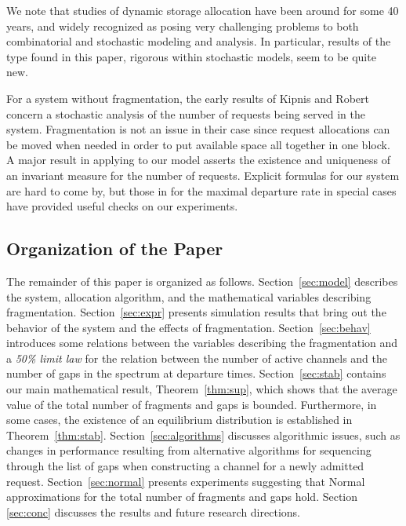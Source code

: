 \documentclass{amsart}
\begin{document}
We note that studies of dynamic storage allocation have been around for some
40 years, and widely recognized as posing very challenging problems
to both combinatorial and stochastic modeling and analysis. In particular, results of  the type
found in this paper, rigorous within stochastic models, seem to be quite new.

For a system without fragmentation, the early results of Kipnis and Robert \cite{KipnisR1990}
concern a stochastic analysis of the number of requests being served in the system.  Fragmentation is not an
issue in their case since request  allocations can  be moved  when  needed in  order to  put
available space all together in one  block.   A major result in  \cite{KipnisR1990} applying to our
model  asserts the existence  and uniqueness  of an  invariant measure  for the  number of
requests.  Explicit  formulas   for  our  system  are  hard  to  come   by,  but  those  in
\cite{KipnisR1990} for  the maximal departure rate  in special cases  have provided useful
checks on our experiments.

\subsection*{Organization of the Paper}
The remainder of this paper  is organized as follows.  Section~\ref{sec:model} describes the system, allocation algorithm, and the mathematical variables describing fragmentation. Section~\ref{sec:expr} presents simulation results that bring out the behavior of the system and the effects of fragmentation.  Section~\ref{sec:behav}
introduces some relations between the variables describing the fragmentation and a  {\em 50\% limit law} for  the relation between
the number of active  channels and the number of gaps in  the spectrum at departure times.
Section~\ref{sec:stab} contains our main mathematical result, Theorem~\ref{thm:sup}, which
shows  that the  average value  of the  total number  of fragments  and gaps  is bounded.
Furthermore, in some  cases, the existence of an  equilibrium distribution is established in
Theorem~\ref{thm:stab}. Section~\ref{sec:algorithms} discusses  algorithmic  issues, such  as  changes  in
performance resulting from alternative algorithms  for sequencing through the list of gaps
when  constructing  a channel  for  a  newly  admitted request.  Section~\ref{sec:normal}  presents  experiments suggesting  that
Normal approximations for the total number of fragments and gaps
hold. Section  \ref{sec:conc}
discusses the results and future research directions. 
\end{document}
